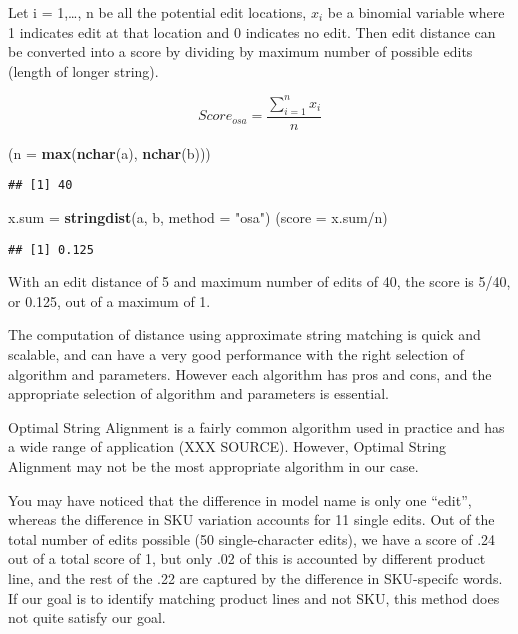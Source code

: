 \documentclass[]{article}
\newenvironment{Shaded}{\begin{snugshade}}{\end{snugshade}}
\newcommand{\KeywordTok}[1]{\textcolor[rgb]{0.13,0.29,0.53}{\textbf{{#1}}}}
\newcommand{\DataTypeTok}[1]{\textcolor[rgb]{0.13,0.29,0.53}{{#1}}}
\newcommand{\StringTok}[1]{\textcolor[rgb]{0.31,0.60,0.02}{{#1}}}
\newcommand{\NormalTok}[1]{{#1}}
\begin{document}
Let i = 1,\ldots{}, n be all the potential edit locations, \(x_{i}\) be
a binomial variable where 1 indicates edit at that location and 0
indicates no edit. Then edit distance can be converted into a score by
dividing by maximum number of possible edits (length of longer string).

\[
Score_{osa} = \frac{\sum_{i=1}^{n} x_{i}}{n}
\]

\begin{Shaded}
\begin{Highlighting}[]
\NormalTok{(}\DataTypeTok{n =} \KeywordTok{max}\NormalTok{(}\KeywordTok{nchar}\NormalTok{(a), }\KeywordTok{nchar}\NormalTok{(b)))}
\end{Highlighting}
\end{Shaded}

\begin{verbatim}
## [1] 40
\end{verbatim}

\begin{Shaded}
\begin{Highlighting}[]
\NormalTok{x.sum =}\StringTok{ }\KeywordTok{stringdist}\NormalTok{(a, b, }\DataTypeTok{method =} \StringTok{"osa"}\NormalTok{)}
\NormalTok{(}\DataTypeTok{score =} \NormalTok{x.sum/n)}
\end{Highlighting}
\end{Shaded}

\begin{verbatim}
## [1] 0.125
\end{verbatim}

With an edit distance of 5 and maximum number of edits of 40, the score
is 5/40, or 0.125, out of a maximum of 1.

The computation of distance using approximate string matching is quick
and scalable, and can have a very good performance with the right
selection of algorithm and parameters. However each algorithm has pros
and cons, and the appropriate selection of algorithm and parameters is
essential.

Optimal String Alignment is a fairly common algorithm used in practice
and has a wide range of application (XXX SOURCE). However, Optimal
String Alignment may not be the most appropriate algorithm in our case.

You may have noticed that the difference in model name is only one
``edit'', whereas the difference in SKU variation accounts for 11 single
edits. Out of the total number of edits possible (50 single-character
edits), we have a score of .24 out of a total score of 1, but only .02
of this is accounted by different product line, and the rest of the .22
are captured by the difference in SKU-specifc words. If our goal is to
identify matching product lines and not SKU, this method does not quite
satisfy our goal.
\end{document}
